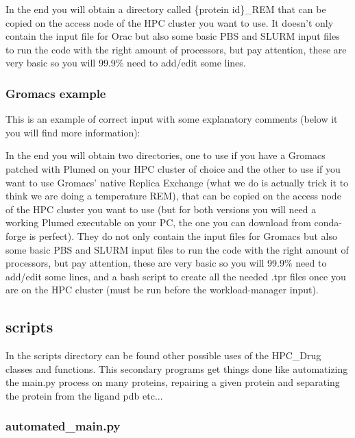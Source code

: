 					

					In the end you will obtain a directory called \{protein id\}\_REM that can be copied on the access node of the HPC cluster you want to use. It doesn't only contain the input file for Orac\cite{orac} but also some basic PBS and SLURM input files to run the code with the right amount of processors, but pay attention, these are very basic so you will 99.9\% need to add/edit some lines.
								
				\subsubsection*{Gromacs example}
				
					This is an example of correct input with some explanatory comments (below it you will find more information):
				
					
				
					In the end you will obtain two directories, one to use if you have a Gromacs\cite{gromacs_ABRAHAM201519} patched with Plumed\cite{plumed} on your HPC cluster of choice and the other to use if you want to use Gromacs' native Replica Exchange (what we do is actually trick it to think we are doing a temperature REM), that can be copied on the access node of the HPC cluster you want to use (but for both versions you will need a working Plumed executable on your PC, the one you can download from conda-forge is perfect). They do not only contain the input files for Gromacs but also some basic PBS and SLURM input files to run the code with the right amount of processors, but pay attention, these are very basic so you will 99.9\% need to add/edit some lines, and a bash script to create all the needed .tpr files once you are on the HPC cluster (must be run before the workload-manager input).
				
	\subsection{scripts}
	
		In the scripts directory can be found other possible uses of the HPC\_Drug classes and functions. This secondary programs get things done like automatizing the main.py process on many proteins, repairing a given protein and separating the protein from the ligand pdb etc...
		
		\subsubsection{automated\_main.py}
		
